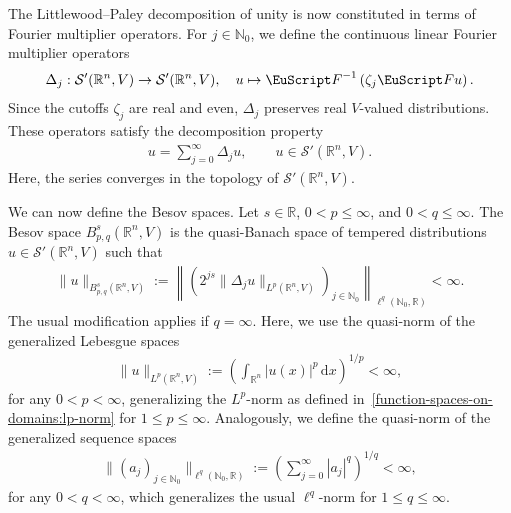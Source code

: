 \documentclass[10pt,a4paper]{amsart}
\theoremstyle{definition}
\theoremstyle{remark}
\numberwithin{equation}{section}
\newcommand{\bbN}{{\mathbb N}}
\newcommand{\bbR}{{\mathbb R}}
\newcommand{\calS}{{\mathcal S}}
\newcommand{\euF}{{\EuScript F}}
\newcommand{\dif}{{\mathrm d}}
\newcommand{\vecnorm}[1]{|#1|}
\newcommand{\Fourier}{{\euF}}
\newcommand{\VEC}{{V}}
\begin{document}
The Littlewood--Paley decomposition of unity is now constituted in terms of Fourier multiplier operators.
For $j \in \bbN_{0}$, we define the continuous linear Fourier multiplier operators
\begin{align*}
    \Delta_{j} : \calS'(\bbR^{n},\VEC) \to \calS'(\bbR^{n},\VEC),
    \quad 
    u \mapsto \Fourier^{-1}\left( \zeta_{j} \Fourier u \right).
\end{align*}
Since the cutoffs $\zeta_j$ are real and even, $\Delta_j$ preserves real $\VEC$-valued distributions.
These operators satisfy the decomposition property
\begin{align*}
    u = \sum_{j=0}^{\infty} \Delta_{j} u, \qquad u \in \calS'(\bbR^{n},\VEC).
\end{align*}
Here, the series converges in the topology of $\calS'(\bbR^{n},\VEC)$.



We can now define the Besov spaces. 
Let $s \in \bbR$, $0 < p \leq \infty$, and $0 < q \leq \infty$.
The Besov space $B^{s}_{p,q}(\bbR^{n},\VEC)$ is the quasi-Banach space of tempered distributions $u \in \calS'(\bbR^{n},\VEC)$ such that 
\begin{align}\label{math:besov-quasinorm}
    \| u \|_{B^{s}_{p,q}(\bbR^{n},\VEC)}
    :=
    \left\|
        \left(
            2^{js} \| \Delta_{j} u \|_{L^{p}(\bbR^{n},\VEC)}
        \right)_{j \in \bbN_{0}}
    \right\|_{\ell^{q}(\bbN_{0},\bbR)}
    < 
    \infty.
\end{align}
The usual modification applies if $q = \infty$.
Here, we use the quasi-norm of the generalized Lebesgue spaces
\begin{gather*}
    \| u \|_{L^{p}(\bbR^{n},\VEC)}
    :=
    \left(
        \int_{\bbR^{n}} \vecnorm{u(x)}^{p} \,\dif x
    \right)^{1/p}
    < \infty
    ,
\end{gather*}
for any $0 < p < \infty$, generalizing the $L^{p}$-norm as defined in~\eqref{function-spaces-on-domains:lp-norm} for $1 \leq p \leq \infty$.
Analogously, we define the quasi-norm of the generalized sequence spaces
\begin{gather*}
    \| (a_{j})_{j \in \bbN_{0}} \|_{\ell^{q}(\bbN_{0},\bbR)}
    :=
    \left(
        \sum_{j=0}^{\infty} |a_{j}|^{q}
    \right)^{1/q}
    < \infty
    ,
\end{gather*}
for any $0 < q < \infty$, which generalizes the usual $\ell^{q}$-norm for $1 \leq q \leq \infty$.
\end{document}
